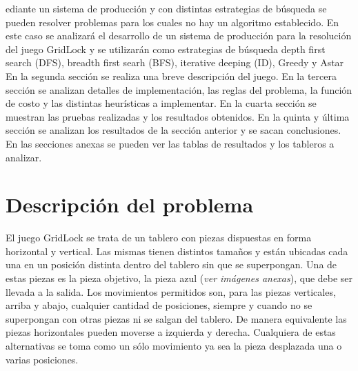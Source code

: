 \documentclass[10pt,journal,compsoc]{IEEEtran}
\begin{document}
% 
% 
% 
% 
ediante un sistema de producci\'on y con distintas estrategias de b\'usqueda se pueden resolver problemas para los cuales no hay un algoritmo establecido. En este caso se analizar\'a el desarrollo de un sistema de producci\'on para la resoluci\'on del juego GridLock y se utilizar\'an como estrategias de b\'usqueda depth first search (DFS), breadth first searh (BFS), iterative deeping (ID), Greedy y Astar\\
En la segunda secci\'on se realiza una breve descripci\'on del juego.
En la tercera secci\'on se analizan detalles de implementaci\'on, las reglas del problema, la funci\'on de costo y las distintas heur\'isticas a implementar.
En la cuarta secci\'on se muestran las pruebas realizadas y los resultados obtenidos.
En la quinta y \'ultima secci\'on se analizan los resultados de la secci\'on anterior y se sacan conclusiones.
En las secciones anexas se pueden ver las tablas de resultados y los tableros a analizar.

\section{Descripci\'on del problema}
El juego GridLock se trata de un tablero con piezas dispuestas en forma horizontal y vertical. Las mismas tienen distintos tama\~nos y est\'an ubicadas cada una en un posici\'on distinta dentro del tablero sin que se superpongan. Una de estas piezas es la pieza objetivo, la pieza azul (\textit{ver im\'agenes anexas}), que debe ser llevada a la salida. Los movimientos permitidos son, para las piezas verticales, arriba y abajo, cualquier cantidad de posiciones, siempre y cuando no se superpongan con otras piezas ni se salgan del tablero. De manera equivalente las piezas horizontales pueden moverse a izquierda y derecha. Cualquiera de estas alternativas se toma como un s\'olo movimiento ya sea la pieza desplazada una o varias posiciones.
\end{document}
